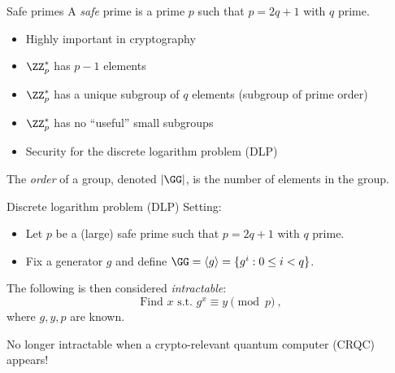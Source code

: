 \begin{frame}{Safe primes}
  A \emph{safe} prime is a prime $p$ such that $p = 2q + 1$ with $q$ prime.
  \begin{itemize}[<+(1)->]
    \item Highly important in cryptography
    \item $\ZZ_p^*$ has $p-1$ elements
    \item $\ZZ_p^*$ has a unique subgroup of $q$ elements (subgroup of prime order)
    \item $\ZZ_p^*$ has no \enquote{useful} small subgroups
    \item Security for the discrete logarithm problem (DLP)
  \end{itemize}

  \vspace*{1em}
  \pause
  The \emph{order} of a group, denoted $\lvert\GG\rvert$, is the number of elements in the group.
\end{frame}

\begin{frame}{Discrete logarithm problem (DLP)}
  Setting:
  \begin{itemize}[<+(1)->]
    \item Let $p$ be a (large) safe prime such that $p = 2q + 1$ with $q$ prime.
    \item Fix a generator $g$ and define $\GG = \langle g \rangle = \{g^i :0 \le i < q\}$.
  \end{itemize}

  \vspace*{1em}

  \pause
  The following is then considered \emph{intractable}:
  \[
    \text{Find $x$ s.t. } g^x \equiv y \pmod{p}\ ,
  \]
  where $g, y, p$ are known.

  \pause
  No longer intractable when a crypto-relevant quantum computer (CRQC) appears!
\end{frame}

